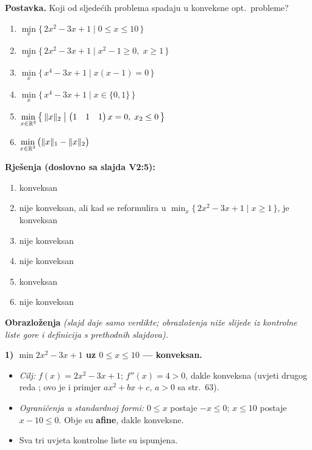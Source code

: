 \begin{zadatak}

\textbf{Postavka.} Koji od sljedećih problema spadaju u konveksne opt.\
probleme?

\begin{enumerate}
  \item $\min\limits_x \{\, 2x^2 - 3x + 1 \mid 0 \le x \le 10 \,\}$
  \item $\min\limits_x \{\, 2x^2 - 3x + 1 \mid x^2 - 1 \ge 0,\; x \ge 1 \,\}$
  \item $\min\limits_x \{\, x^4 - 3x + 1 \mid x(x-1) = 0 \,\}$
  \item $\min\limits_x \{\, x^4 - 3x + 1 \mid x \in \{0, 1\} \,\}$
  \item $\min\limits_{x\in\mathbb{R}^3} \left\{\, \|x\|_2 \;\middle|\;
        \begin{pmatrix}1&1&1\end{pmatrix}x = 0,\; x_2 \le 0 \,\right\}$
  \item $\min\limits_{x\in\mathbb{R}^3} \big(\|x\|_1 - \|x\|_2\big)$
\end{enumerate}

\medskip
\textbf{Rješenja (doslovno sa slajda V2:5):}
\begin{enumerate}
  \item konveksan
  \item nije konveksan, ali kad se reformulira u
        $\min_x\{\, 2x^2 - 3x + 1 \mid x \ge 1 \,\}$, je konveksan
  \item nije konveksan
  \item nije konveksan
  \item konveksan
  \item nije konveksan
\end{enumerate}

\medskip
\textbf{Obrazloženja} \emph{(slajd daje samo verdikte; obrazloženja niže slijede
iz kontrolne liste gore i definicija s prethodnih slajdova).}

\textbf{1) $\min 2x^2 - 3x + 1$ uz $0 \le x \le 10$ --- konveksan.}
\begin{itemize}
  \item \emph{Cilj:} $f(x) = 2x^2 - 3x + 1$; $f''(x) = 4 > 0$, dakle konveksna
        (uvjeti drugog reda \str{70}; ovo je i primjer $ax^2+bx+c$, $a>0$ sa
        str.\ 63).
  \item \emph{Ograničenja u standardnoj formi:} $0 \le x$ postaje $-x \le 0$;
        $x \le 10$ postaje $x - 10 \le 0$. Obje su \textbf{afine}, dakle
        konveksne.
  \item Sva tri uvjeta kontrolne liste su ispunjena. \checkmark
\end{itemize}


\end{zadatak}
